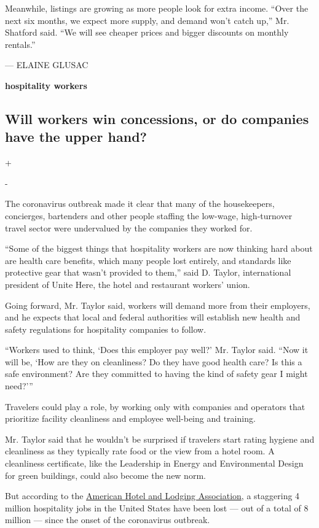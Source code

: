 Meanwhile, listings are growing as more people look for extra income.
``Over the next six months, we expect more supply, and demand won't
catch up,'' Mr. Shatford said. ``We will see cheaper prices and bigger
discounts on monthly rentals.''

--- ELAINE GLUSAC

\textbf{hospitality workers}

\hypertarget{will-workers-win-concessions-or-do-companies-have-the-upper-hand}{%
\subsection{Will workers win concessions, or do companies have the upper
hand?}\label{will-workers-win-concessions-or-do-companies-have-the-upper-hand}}

+

-

The coronavirus outbreak made it clear that many of the housekeepers,
concierges, bartenders and other people staffing the low-wage,
high-turnover travel sector were undervalued by the companies they
worked for.

``Some of the biggest things that hospitality workers are now thinking
hard about are health care benefits, which many people lost entirely,
and standards like protective gear that wasn't provided to them,'' said
D. Taylor, international president of Unite Here, the hotel and
restaurant workers' union.

Going forward, Mr. Taylor said, workers will demand more from their
employers, and he expects that local and federal authorities will
establish new health and safety regulations for hospitality companies to
follow.

``Workers used to think, `Does this employer pay well?' Mr. Taylor said.
``Now it will be, `How are they on cleanliness? Do they have good health
care? Is this a safe environment? Are they committed to having the kind
of safety gear I might need?'''

Travelers could play a role, by working only with companies and
operators that prioritize facility cleanliness and employee well-being
and training.

Mr. Taylor said that he wouldn't be surprised if travelers start rating
hygiene and cleanliness as they typically rate food or the view from a
hotel room. A cleanliness certificate, like the Leadership in Energy and
Environmental Design for green buildings, could also become the new
norm.

But according to the
\href{https://www.ahla.com/covid-19s-impact-hotel-industry}{American
Hotel and Lodging Association}, a staggering 4 million hospitality jobs
in the United States have been lost --- out of a total of 8 million ---
since the onset of the coronavirus outbreak.

